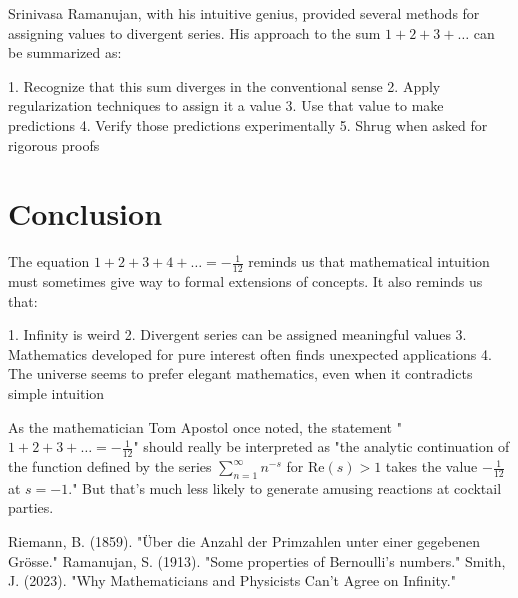 \documentclass{article}
\begin{document}
Srinivasa Ramanujan, with his intuitive genius, provided several methods for assigning values to divergent series. His approach to the sum $1 + 2 + 3 + \ldots$ can be summarized as:

1. Recognize that this sum diverges in the conventional sense
2. Apply regularization techniques to assign it a value
3. Use that value to make predictions
4. Verify those predictions experimentally
5. Shrug when asked for rigorous proofs

\section{Conclusion}

The equation $1 + 2 + 3 + 4 + \ldots = -\frac{1}{12}$ reminds us that mathematical intuition must sometimes give way to formal extensions of concepts. It also reminds us that:

1. Infinity is weird
2. Divergent series can be assigned meaningful values
3. Mathematics developed for pure interest often finds unexpected applications
4. The universe seems to prefer elegant mathematics, even when it contradicts simple intuition

As the mathematician Tom Apostol once noted, the statement "$1 + 2 + 3 + \ldots = -\frac{1}{12}$" should really be interpreted as "the analytic continuation of the function defined by the series $\sum_{n=1}^{\infty} n^{-s}$ for $\text{Re}(s) > 1$ takes the value $-\frac{1}{12}$ at $s = -1$." But that's much less likely to generate amusing reactions at cocktail parties.

\begin{thebibliography}{9}
     Riemann, B. (1859). "Über die Anzahl der Primzahlen unter einer gegebenen Grösse."
     Ramanujan, S. (1913). "Some properties of Bernoulli's numbers."
     Smith, J. (2023). "Why Mathematicians and Physicists Can't Agree on Infinity."
\end{thebibliography}
\end{document}
